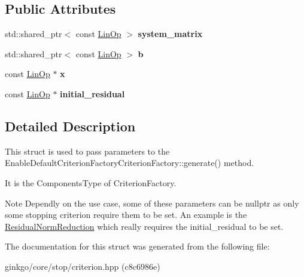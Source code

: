 \subsection*{Public Attributes}
\begin{DoxyCompactItemize}
\item 
\mbox{\label{structgko_1_1stop_1_1CriterionArgs_a2aa22bea76fd64352a446cf6c5570807}} 
std\+::shared\+\_\+ptr$<$ const \hyperlink{classgko_1_1LinOp}{Lin\+Op} $>$ {\bfseries system\+\_\+matrix}
\item 
\mbox{\label{structgko_1_1stop_1_1CriterionArgs_a994457497657a0308c5343e711ec4c3e}} 
std\+::shared\+\_\+ptr$<$ const \hyperlink{classgko_1_1LinOp}{Lin\+Op} $>$ {\bfseries b}
\item 
\mbox{\label{structgko_1_1stop_1_1CriterionArgs_a766a5c79ca77e74703888786e0011a73}} 
const \hyperlink{classgko_1_1LinOp}{Lin\+Op} $\ast$ {\bfseries x}
\item 
\mbox{\label{structgko_1_1stop_1_1CriterionArgs_af7233105d01a9b055b15652daf179a67}} 
const \hyperlink{classgko_1_1LinOp}{Lin\+Op} $\ast$ {\bfseries initial\+\_\+residual}
\end{DoxyCompactItemize}


\subsection{Detailed Description}
This struct is used to pass parameters to the Enable\+Default\+Criterion\+Factory\+Criterion\+Factory\+::generate() method. 

It is the Components\+Type of Criterion\+Factory.

\begin{DoxyNote}{Note}
Dependly on the use case, some of these parameters can be {\ttfamily nullptr} as only some stopping criterion require them to be set. An example is the {\ttfamily \hyperlink{classgko_1_1stop_1_1ResidualNormReduction}{Residual\+Norm\+Reduction}} which really requires the {\ttfamily initial\+\_\+residual} to be set. 
\end{DoxyNote}


The documentation for this struct was generated from the following file\+:\begin{DoxyCompactItemize}
\item 
ginkgo/core/stop/criterion.\+hpp (c8c6986e)\end{DoxyCompactItemize}
